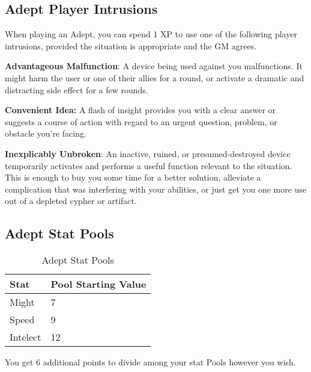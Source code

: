 \begin{multicols}{2}
\subsection{Adept Player Intrusions}

When playing an Adept, you can spend 1 XP to use one of the following player intrusions, provided the situation is appropriate and the GM agrees.

\textbf{Advantageous Malfunction}: A device being used against you malfunctions. It might harm the user or one of their allies for a round, or activate a dramatic and distracting side effect for a few rounds.

\textbf{Convenient Idea:} A flash of insight provides you with a clear answer or suggests a course of action with regard to an urgent question, problem, or obstacle you’re facing.

\textbf{Inexplicably Unbroken}: An inactive, ruined, or presumed-destroyed device temporarily activates and performs a useful function relevant to the situation. This is enough to buy you some time for a better solution, alleviate a complication that was interfering with your abilities, or just get you one more use out of a depleted cypher or artifact.

\subsection{Adept Stat Pools}

\begin{table}[H]
\centering
\caption{Adept Stat Pools}
\label{tab: Adept Stat Pools}

\begin{tabularx}{\linewidth}{| X | X |}
\hline
\textbf{Stat} & \textbf{Pool Starting Value} \\
\hline
Might & 7 \\ \hline
Speed & 9 \\ \hline
Intelect & 12  \\ \hline

\end{tabularx}

\end{table}

\raggedright

You get 6 additional points to divide among your stat Pools however you wish.


\end{multicols}
